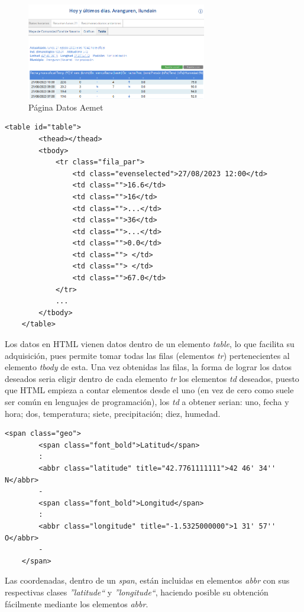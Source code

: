 \begin{figure} [H]
	\centering
	\includegraphics[width=0.7\textwidth]{fig/AemetData.png}
	\caption[Página Aemet de la estación en Aranguren (Navarra)]{Página Datos Aemet}
	\label{fig:ej3}
\end{figure}

\begin{lstlisting}[basicstyle=\footnotesize, caption={HTML tabla datos en Aemet}]
	<table id="table">
		<thead></thead>
		<tbody>
			<tr class="fila_par">
				<td class="evenselected">27/08/2023 12:00</td>
				<td class="">16.6</td>
				<td class="">16</td>
				<td class="">...</td>
				<td class="">36</td>
				<td class="">...</td>
				<td class="">0.0</td>
				<td class=""> </td>
				<td class=""> </td>
				<td class="">67.0</td>
			</tr>
			...
		</tbody>
	</table>
\end{lstlisting}

Los datos en HTML vienen datos dentro de un elemento \textit{table}, lo que facilita su adquisición, pues permite tomar todas las filas (elementos \textit{tr}) pertenecientes al elemento \textit{tbody} de esta. Una vez obtenidas las filas, la forma de lograr los datos deseados seria eligir dentro de cada elemento \textit{tr} los elementos \textit{td} deseados, puesto que HTML empieza a contar elementos desde el uno (en vez de cero como suele ser común en lenguajes de programación), los \textit{td} a obtener serian: uno, fecha y hora; dos, temperatura; siete, precipitación; diez, humedad.

\begin{lstlisting}[basicstyle=\footnotesize, caption={HTML coordenadas en Aemet}]
	<span class="geo">
		<span class="font_bold">Latitud</span>
		:
		<abbr class="latitude" title="42.7761111111">42 46' 34'' N</abbr>
		-
		<span class="font_bold">Longitud</span>
		:
		<abbr class="longitude" title="-1.5325000000">1 31' 57'' O</abbr>
		-
	</span>
\end{lstlisting}

Las coordenadas, dentro de un \textit{span}, están incluidas en elementos \textit{abbr} con sus respectivas clases \textit{''latitude``} y \textit{''longitude``}, haciendo posible su obtención fácilmente mediante los elementos \textit{abbr}.

